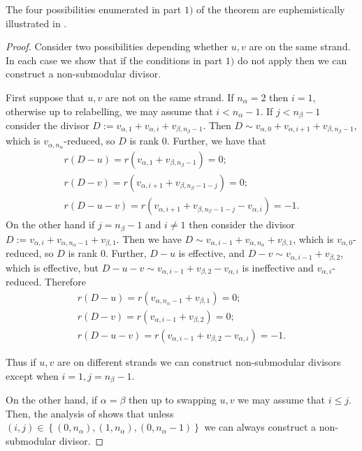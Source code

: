 \documentclass[11pt]{article}
\theoremstyle{definition}
\numberwithin{equation}{section}
\newcommand{\set}[1]{\left\{{#1}\right\}}
\begin{document}
The four possibilities enumerated in part $1)$ of the theorem are euphemistically illustrated in .

\begin{proof}
Consider two possibilities depending whether $u,v$ are on the same strand. In each case we show that if the conditions in part $1)$ do not apply then we can construct a non-submodular divisor.

First suppose that $u,v$ are not on the same strand. If $n_\alpha = 2$ then $i = 1$, otherwise up to relabelling, we may assume that $i<n_\alpha-1$. If $j<n_\beta-1$ consider the divisor $D:= v_{\alpha,1}+v_{\alpha,i}+v_{\beta,n_\beta-1}$. Then $D \sim v_{\alpha,0} + v_{\alpha,i+1} + v_{\beta,n_\beta-1}$, which is $v_{\alpha,n_\alpha}$-reduced, so $D$ is rank $0$.  Further, we have that
\begin{align*}
    r(D-u) = r(v_{\alpha,1}+v_{\beta,n_\beta-1})  = 0;\\
    r(D-v) = r(v_{\alpha,i+1}+v_{\beta,n_\beta-1-j}) = 0;\\
    r(D-u-v) = r(v_{\alpha,i+1}+v_{\beta,n_\beta-1-j}-v_{\alpha,i}) = -1.
\end{align*}
On the other hand if $j = n_\beta-1$ and $i \neq 1$ then consider the divisor $D:= v_{\alpha,i}+v_{\alpha,n_\alpha-1}+v_{\beta,1}$. 
Then we have $D \sim v_{\alpha,i-1} + v_{\alpha,n_\alpha} + v_{\beta,1}$, which is $v_{\alpha, 0}$-reduced, so $D$ is rank $0$. 
Further, $D-u$ is effective, and $D-v \sim v_{\alpha,i-1} + v_{\beta,2}$, which is effective, but $D-u-v \sim v_{\alpha,i-1} + v_{\beta,2} - v_{\alpha,i}$ is ineffective and $v_{\alpha,i}$-reduced. Therefore
\begin{align*}
    r(D-u) = r(v_{\alpha,n_\alpha-1}+v_{\beta,1}) = 0;\\
    r(D-v) = r(v_{\alpha,i-1}+v_{\beta,2}) = 0;\\
    r(D-u-v) = r(v_{\alpha,i-1}+v_{\beta,2}-v_{\alpha,i}) = -1.
\end{align*}

Thus if $u,v$ are on different strands we can construct non-submodular divisors except when $i = 1,j = n_\beta-1$.

On the other hand, if $\alpha = \beta$ then up to swapping $u,v$ we may assume that $i \leq j$. Then, the analysis of  shows that unless $(i,j) \in \set{(0,n_\alpha),(1,n_\alpha),(0,n_\alpha-1)}$ we can always construct a non-submodular divisor.
\end{proof}
\end{document}
